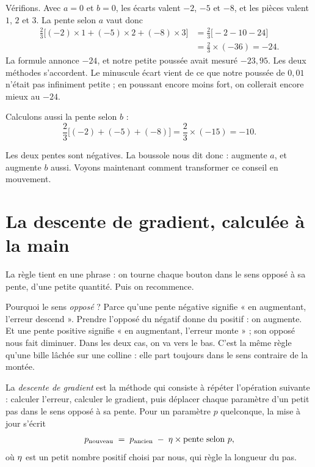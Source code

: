 \begin{exemple}
Vérifions. Avec $a = 0$ et $b = 0$, les écarts valent $-2$, $-5$ et $-8$, et
les pièces valent $1$, $2$ et $3$. La pente selon $a$ vaut donc
\begin{align*}
  \frac{2}{3}\bigl[(-2)\times 1 + (-5)\times 2 + (-8)\times 3\bigr]
    &= \frac{2}{3}\bigl[-2 - 10 - 24\bigr] \\[2pt]
    &= \frac{2}{3}\times(-36) = -24 .
\end{align*}
La formule annonce $-24$, et notre petite poussée avait mesuré $-23{,}95$.
Les deux méthodes s'accordent. Le minuscule écart vient de ce que notre
poussée de $0{,}01$ n'était pas infiniment petite ; en poussant encore
moins fort, on collerait encore mieux au $-24$.

Calculons aussi la pente selon $b$ :
\[
  \frac{2}{3}\bigl[(-2) + (-5) + (-8)\bigr]
  = \frac{2}{3}\times(-15) = -10 .
\]
\end{exemple}

Les deux pentes sont négatives. La boussole nous dit donc : augmente $a$,
et augmente $b$ aussi. Voyons maintenant comment transformer ce conseil en
mouvement.

\section{La descente de gradient, calculée à la main}

\begin{enclair}
La règle tient en une phrase : on tourne chaque bouton dans le sens opposé
à sa pente, d'une petite quantité. Puis on recommence.
\end{enclair}

Pourquoi le sens \emph{opposé} ? Parce qu'une pente négative signifie « en
augmentant, l'erreur descend ». Prendre l'opposé du négatif donne du
positif : on augmente. Et une pente positive signifie « en augmentant,
l'erreur monte » ; son opposé nous fait diminuer. Dans les deux cas, on va
vers le bas. C'est la même règle qu'une bille lâchée sur une colline : elle
part toujours dans le sens contraire de la montée.

\begin{definition}
La \emph{descente de gradient} est la méthode qui consiste à répéter
l'opération suivante : calculer l'erreur, calculer le gradient, puis
déplacer chaque paramètre d'un petit pas dans le sens opposé à sa pente.
Pour un paramètre $p$ quelconque, la mise à jour s'écrit
\[
  p_{\text{nouveau}} \;=\; p_{\text{ancien}}
       \;-\; \eta \times \text{pente selon } p ,
\]
où $\eta$ est un petit nombre positif choisi par nous, qui règle la
longueur du pas.
\end{definition}

